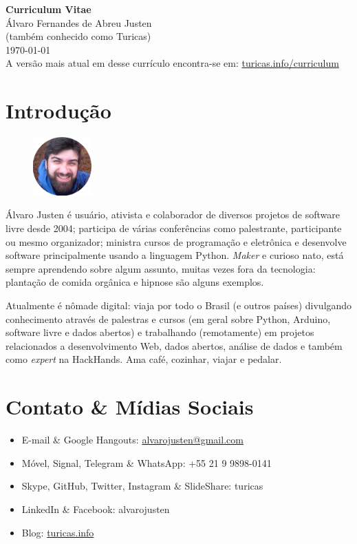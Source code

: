 \documentclass[a4paper,11pt]{article}
\begin{document}
\pagestyle{empty}

\begin{center}
 \huge{\textbf{Curriculum Vitae}}
 \\
 \huge{Álvaro Fernandes de Abreu Justen}
 \\
 \small{(também conhecido como Turicas)}
 \large{\\}
 \large{\today}
 \\
 \small{A versão mais atual em desse currículo encontra-se em:
        \href{http://turicas.info/curriculum}{turicas.info/curriculum}}
\end{center}

\newcommand{\titulo}[1]{\section*{#1}}
\renewcommand{\labelitemi}{$\diamond$}
\renewcommand{\labelitemii}{$\rightarrow$}

\titulo{Introdução}
\begin{figure}
	\begin{center}
		\includegraphics[width=0.2\textwidth]{turicas}
	\end{center}
\end{figure}

Álvaro Justen é usuário, ativista e colaborador de diversos projetos de
software livre desde 2004; participa de várias conferências como palestrante,
participante ou mesmo organizador; ministra cursos de programação e eletrônica
e desenvolve software principalmente usando a linguagem Python. \textit{Maker}
e curioso nato, está sempre aprendendo sobre algum assunto, muitas vezes fora
da tecnologia: plantação de comida orgânica e hipnose são alguns exemplos.

Atualmente é nômade digital: viaja por todo o Brasil (e outros países)
divulgando conhecimento através de palestras e cursos (em geral sobre Python,
Arduino, software livre e dados abertos) e trabalhando (remotamente) em
projetos relacionados a desenvolvimento Web, dados abertos, análise de dados e
também como \textit{expert} na HackHands. Ama café, cozinhar, viajar e pedalar.


\titulo{Contato \& Mídias Sociais}
	\begin{itemize}
		\renewcommand{\labelitemi}{}
		\item E-mail \& Google Hangouts: \url{alvarojusten@gmail.com}
		\item Móvel, Signal, Telegram \& WhatsApp: +55 21 9 9898-0141
		\item Skype, GitHub, Twitter, Instagram \& SlideShare: turicas
		\item LinkedIn \& Facebook: alvarojusten
		\item Blog: \href{http://turicas.info/}{turicas.info}
	\end{itemize}
\end{document}
